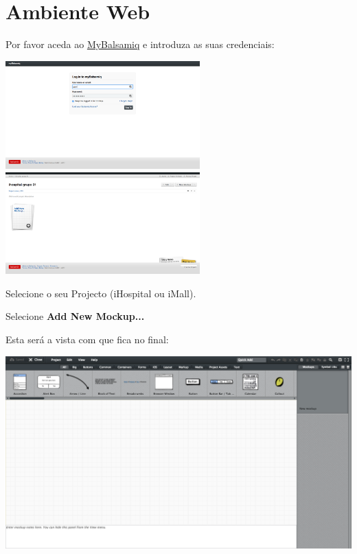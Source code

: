 \documentclass{tufte-book} %
\begin{document}
\mainmatter

\chapter{Ambiente Web}

Por favor aceda ao \href{https://tecnico.mybalsamiq.com/}{MyBalsamiq} e introduza as suas credenciais:

\begin{center}
	\includegraphics[width=7.50cm]{img26.png}
	\hfill
	\includegraphics[width=7.50cm]{img27.png}
\end{center}

Selecione o seu Projecto (iHospital ou iMall).

Selecione \textbf{Add New Mockup...}

Esta será a vista com que fica no final:

\begin{center}
	\includegraphics{img28.png}
\end{center}
\end{document}
